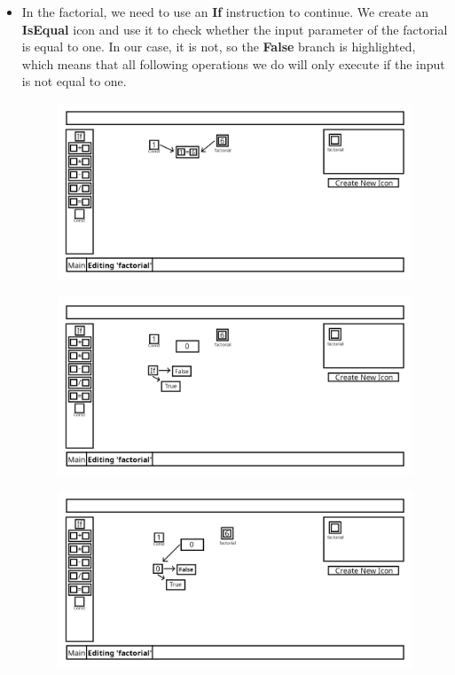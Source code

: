\documentclass{article}
\begin{document}
\begin{itemize}
            \item
                In the factorial, we need to use an \textbf{If} instruction to continue. We create an \textbf{IsEqual} icon and
                use it to check whether the input parameter of the factorial is equal to one. In our case, it is not, so the
                \textbf{False} branch is highlighted, which means that all following operations we do will only execute if the
                input is not equal to one.
                \begin{figure}[H]
                    \includegraphics[width=\textwidth]{include/example_factorial_fill_equals.png}
                    \centering
                \end{figure}
                \begin{figure}[H]
                    \includegraphics[width=\textwidth]{include/example_factorial_add_if.png}
                    \centering
                \end{figure}
                \begin{figure}[H]
                    \includegraphics[width=\textwidth]{include/example_factorial_eval_if.png}
                    \centering
                \end{figure}


\end{itemize}
\end{document}
